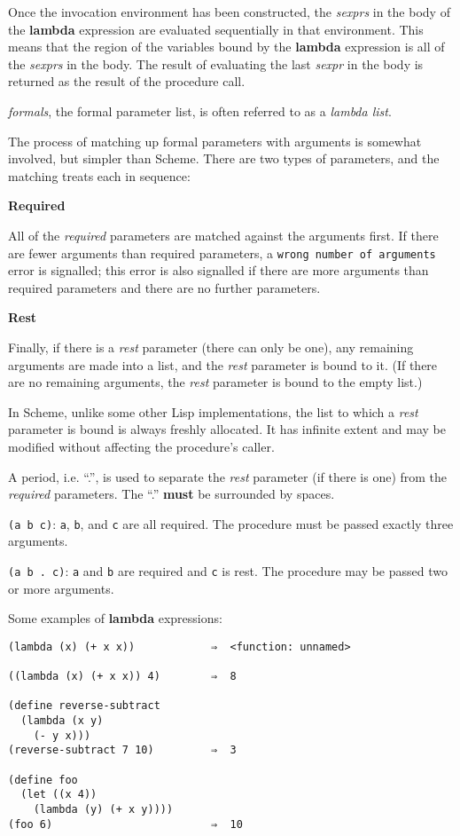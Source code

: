 \documentclass{article}
\begin{document}
Once the invocation environment has been constructed, the \emph{sexprs} in the body of the
\textbf{lambda} expression are evaluated sequentially in that environment. This means that the
region of the variables bound by the \textbf{lambda} expression is all of the \emph{sexprs} in
the body. The result of evaluating the last \emph{sexpr} in the body is returned as the result
of the procedure call.

\emph{formals}, the formal parameter list, is often referred to as a \emph{lambda list}.

The process of matching up formal parameters with arguments is somewhat involved, but simpler
than Scheme. There are two types of parameters, and the matching treats each in sequence:

\textbf{Required}

All of the \emph{required} parameters are matched against the arguments first. If there are
fewer arguments than required parameters, a \verb|wrong number of arguments| error is
signalled; this error is also signalled if there are more arguments than required parameters
and there are no further parameters.

\textbf{Rest}

Finally, if there is a \emph{rest} parameter (there can only be one), any remaining arguments
are made into a list, and the \emph{rest} parameter is bound to it. (If there are no remaining
arguments, the \emph{rest} parameter is bound to the empty list.)

In Scheme, unlike some other Lisp implementations, the list to which a \emph{rest} parameter is bound
is always freshly allocated. It has infinite extent and may be modified without affecting the
procedure's caller.

A period, i.e. ``.'', is used to separate the \emph{rest} parameter (if there is one) from the
\emph{required} parameters. The ``.'' \textbf{must} be surrounded by spaces.

\verb|(a b c)|: \verb|a|, \verb|b|, and \verb|c| are all required. The procedure must be
passed exactly three arguments.

\verb|(a b . c)|: \verb|a| and \verb|b| are required and \verb|c| is rest. The procedure may
be passed two or more arguments.

Some examples of \textbf{lambda} expressions:

\begin{verbatim}
(lambda (x) (+ x x))            ⇒  <function: unnamed>

((lambda (x) (+ x x)) 4)        ⇒  8

(define reverse-subtract
  (lambda (x y)
    (- y x)))
(reverse-subtract 7 10)         ⇒  3

(define foo
  (let ((x 4))
    (lambda (y) (+ x y))))
(foo 6)                         ⇒  10
\end{verbatim}
\end{document}
